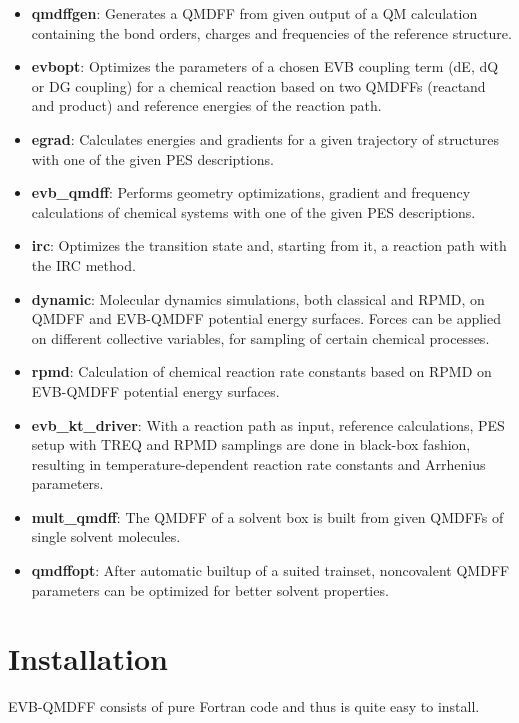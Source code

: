\documentclass[12pt,a4paper]{scrartcl}
\begin{document}
\begin{itemize}
 \item \textbf{qmdffgen}: Generates a QMDFF from given output of a QM calculation containing the
     bond orders, charges and frequencies of the reference structure.
 \item \textbf{evbopt}: Optimizes the parameters of a chosen EVB coupling term 
     (dE, dQ or DG coupling) for a chemical reaction
     based on two QMDFFs (reactand and product) and reference energies of the reaction path.
 \item \textbf{egrad}: Calculates energies and gradients for a given trajectory of structures
     with one of the given PES descriptions.
 \item \textbf{evb\_qmdff}: Performs geometry optimizations, gradient and frequency calculations of
     chemical systems with one of the given PES descriptions.
 \item \textbf{irc}: Optimizes the transition state and, starting from it, a reaction path with the
     IRC method.
 \item \textbf{dynamic}: Molecular dynamics simulations, both classical and RPMD, on QMDFF
    and EVB-QMDFF potential energy surfaces. Forces can be applied on different collective
    variables, for sampling of certain chemical processes.
 \item \textbf{rpmd}: Calculation of chemical reaction rate constants based on RPMD on EVB-QMDFF
     potential energy surfaces.
  \item \textbf{evb\_kt\_driver}: With a reaction path as input, reference calculations, PES setup
     with TREQ and RPMD samplings are done in black-box fashion, resulting in temperature-dependent
     reaction rate constants and Arrhenius parameters.
  \item \textbf{mult\_qmdff}: The QMDFF of a solvent box is built from given QMDFFs of single
     solvent molecules.
  \item \textbf{qmdffopt}: After automatic builtup of a suited trainset, 
     noncovalent QMDFF parameters can
     be optimized for better solvent properties.
\end{itemize}

\newpage

\section{Installation}

EVB-QMDFF consists of pure Fortran code and thus is quite easy to install.
\end{document}
